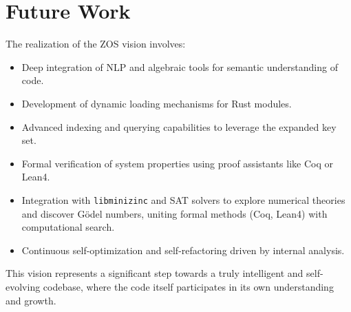 \documentclass{article}
\begin{document}
\section{Future Work}
The realization of the ZOS vision involves:
\begin{itemize}
    \item Deep integration of NLP and algebraic tools for semantic understanding of code.
    \item Development of dynamic loading mechanisms for Rust modules.
    \item Advanced indexing and querying capabilities to leverage the expanded key set.
    \item Formal verification of system properties using proof assistants like Coq or Lean4.
    \item Integration with \texttt{libminizinc} and SAT solvers to explore numerical theories and discover Gödel numbers, uniting formal methods (Coq, Lean4) with computational search.
\item Continuous self-optimization and self-refactoring driven by internal analysis.
\end{itemize}

This vision represents a significant step towards a truly intelligent and self-evolving codebase, where the code itself participates in its own understanding and growth.
\end{document}
